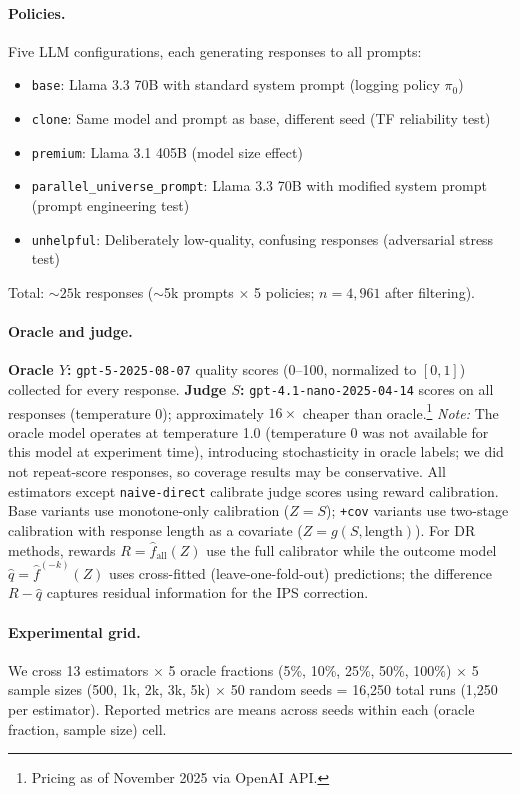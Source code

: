 \paragraph{Policies.}
Five LLM configurations, each generating responses to all prompts:
\begin{itemize}[leftmargin=*,nosep]
\item \texttt{base}: Llama 3.3 70B with standard system prompt (logging policy $\pi_0$)
\item \texttt{clone}: Same model and prompt as base, different seed (TF reliability test)
\item \texttt{premium}: Llama 3.1 405B (model size effect)
\item \texttt{parallel\_universe\_prompt}: Llama 3.3 70B with modified system prompt (prompt engineering test)
\item \texttt{unhelpful}: Deliberately low-quality, confusing responses (adversarial stress test)
\end{itemize}
Total: ${\sim}25$k responses (${\sim}$5k prompts $\times$ 5 policies; $n{=}4{,}961$ after filtering).

\paragraph{Oracle and judge.}
\textbf{Oracle $Y$:} \texttt{gpt-5-2025-08-07} \citep{OpenAI2025GPT5} quality scores (0--100, normalized to $[0,1]$) collected for every response.
\textbf{Judge $S$:} \texttt{gpt-4.1-nano-2025-04-14} scores on all responses (temperature 0); approximately $16\times$ cheaper than oracle.\footnote{Pricing as of November 2025 via OpenAI API.}
\emph{Note:} The oracle model operates at temperature 1.0 (temperature 0 was not available for this model at experiment time), introducing stochasticity in oracle labels; we did not repeat-score responses, so coverage results may be conservative.
All estimators except \texttt{naive-direct} calibrate judge scores using reward calibration. Base variants use monotone-only calibration ($Z{=}S$); \texttt{+cov} variants use two-stage calibration with response length as a covariate ($Z{=}g(S,\text{length})$).
For DR methods, rewards $R=\hat f_{\mathrm{all}}(Z)$ use the full calibrator while the outcome model $\hat q=\hat f^{(-k)}(Z)$ uses cross-fitted (leave-one-fold-out) predictions; the difference $R-\hat q$ captures residual information for the IPS correction.

\paragraph{Experimental grid.}
We cross 13 estimators $\times$ 5 oracle fractions (5\%, 10\%, 25\%, 50\%, 100\%) $\times$ 5 sample sizes (500, 1k, 2k, 3k, 5k) $\times$ 50 random seeds = 16,250 total runs (1,250 per estimator). Reported metrics are means across seeds within each (oracle fraction, sample size) cell.


